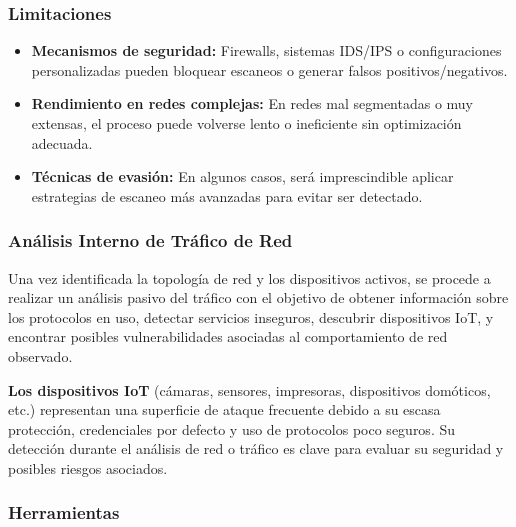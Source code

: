 \documentclass[a4paper, 11pt]{article}
\begin{document}
\subsubsection*{Limitaciones}

\begin{itemize}
   
    \item \textbf{Mecanismos de seguridad:} Firewalls, sistemas IDS/IPS o configuraciones personalizadas pueden bloquear escaneos o generar falsos positivos/negativos.
    
    \item \textbf{Rendimiento en redes complejas:} En redes mal segmentadas o muy extensas, el proceso puede volverse lento o ineficiente sin optimización adecuada.
    
    \item \textbf{Técnicas de evasión:} En algunos casos, será imprescindible aplicar estrategias de escaneo más avanzadas para evitar ser detectado.
\end{itemize}

\par\vspace{0.5cm}

\subsubsection{Análisis Interno de Tráfico de Red}

Una vez identificada la topología de red y los dispositivos activos, se procede a realizar un análisis pasivo del tráfico con el objetivo 
de obtener información sobre los protocolos en uso, detectar servicios inseguros, descubrir dispositivos IoT, y encontrar posibles vulnerabilidades asociadas al comportamiento de red observado.
\par\vspace{0.5cm}

\textbf{Los dispositivos IoT} (cámaras, sensores, impresoras, dispositivos domóticos, etc.) representan una superficie de 
ataque frecuente debido a su escasa protección, credenciales por defecto y uso de protocolos poco seguros. Su detección durante 
el análisis de red o tráfico es clave para evaluar su seguridad y posibles riesgos asociados.

\vspace{0.5cm}
\subsubsection*{Herramientas}
\end{document}
